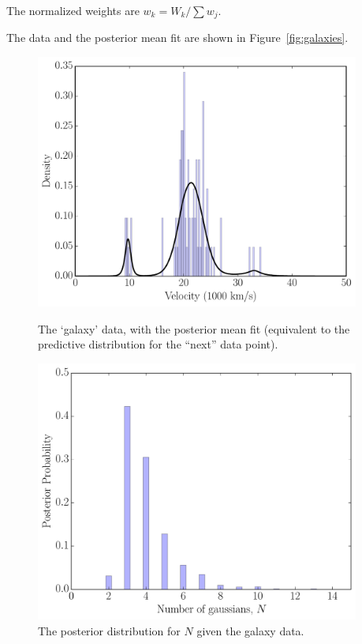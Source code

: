 \documentclass[article]{jss}
\begin{document}
The normalized weights are $w_k = W_k/\sum w_j$.


The data and the posterior mean fit are shown
in Figure~\ref{fig:galaxies}.

\begin{figure}
\begin{minipage}{0.45\textwidth}
\centering
\includegraphics[width=0.95\textwidth]{figures/galaxies.pdf}
\caption{The `galaxy' data, with the posterior mean fit
(equivalent to the predictive distribution for the ``next'' data point).\label{fig:galaxies}}
\end{minipage} \hspace{0.05\textwidth}
\begin{minipage}{0.45\textwidth}
\centering
\includegraphics[width=0.95\textwidth]{figures/galaxies_N.pdf}
\caption{The posterior distribution for $N$ given the
galaxy data.\label{fig:galaxies_N}}
\end{minipage}
\end{figure}
\end{document}
